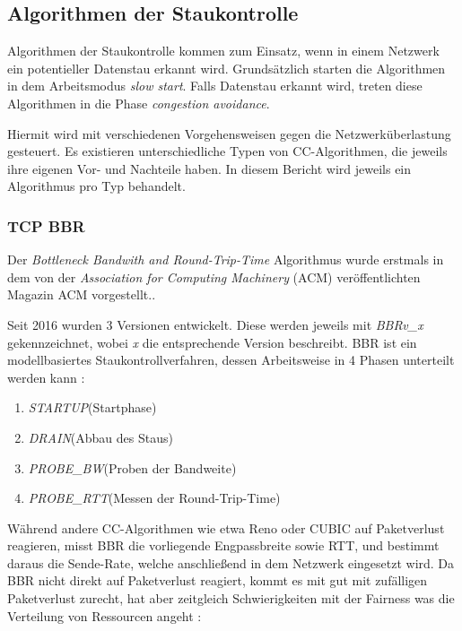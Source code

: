 \documentclass[paper=a4,fontsize=12pt,ngerman]{scrartcl}
\begin{document}
\subsection{Algorithmen der Staukontrolle }

Algorithmen der Staukontrolle kommen zum Einsatz, wenn in einem Netzwerk ein potentieller Datenstau erkannt wird.
Grundsätzlich starten die Algorithmen in dem Arbeitsmodus \textit{slow start}.
Falls Datenstau erkannt wird, treten diese Algorithmen in die Phase \textit{congestion avoidance}.


 Hiermit wird mit verschiedenen Vorgehensweisen gegen die Netzwerküberlastung gesteuert. 
\newline
Es existieren unterschiedliche Typen von CC-Algorithmen, die jeweils ihre eigenen Vor- und Nachteile haben.
In diesem Bericht wird jeweils ein Algorithmus pro Typ behandelt.





\subsubsection{TCP BBR} 
Der \textit{Bottleneck Bandwith and Round-Trip-Time} Algorithmus wurde erstmals in dem von der
\textit{Association for Computing Machinery} (ACM) veröffentlichten Magazin ACM vorgestellt.\cite{cardwell2016bbr}. 

Seit 2016 wurden 3 Versionen entwickelt. Diese werden jeweils mit \textit{BBRv\_x} gekennzeichnet, 
wobei \textit{x} die entsprechende Version beschreibt. \newline
BBR ist ein modellbasiertes Staukontrollverfahren, dessen Arbeitsweise in 4 Phasen
unterteilt werden kann : \newline

\begin{enumerate}
    \item \textit{STARTUP}(Startphase)
    \item \textit{DRAIN}(Abbau des Staus)
    \item \textit{PROBE\_BW}(Proben der Bandweite)
    \item \textit{PROBE\_RTT}(Messen der Round-Trip-Time)
\end{enumerate}


Während andere CC-Algorithmen wie etwa Reno oder CUBIC auf Paketverlust reagieren, misst BBR die vorliegende Engpassbreite sowie RTT,
und bestimmt daraus die Sende-Rate, welche anschließend in dem Netzwerk eingesetzt wird. 
Da BBR nicht direkt auf Paketverlust reagiert, kommt es mit gut mit zufälligen Paketverlust zurecht, hat aber zeitgleich
Schwierigkeiten mit der Fairness was die Verteilung von Ressourcen angeht : 
\end{document}
